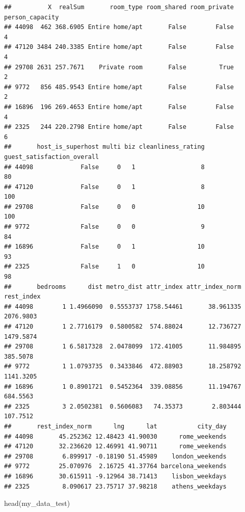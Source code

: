 \documentclass[
]{article}
\newenvironment{Shaded}{\begin{snugshade}}{\end{snugshade}}
\newcommand{\FunctionTok}[1]{\textcolor[rgb]{0.00,0.00,0.00}{#1}}
\newcommand{\NormalTok}[1]{#1}
\begin{document}
\begin{verbatim}
##          X  realSum       room_type room_shared room_private person_capacity
## 44098  462 368.6905 Entire home/apt       False        False               4
## 47120 3484 240.3385 Entire home/apt       False        False               4
## 29708 2631 257.7671    Private room       False         True               2
## 9772   856 485.9543 Entire home/apt       False        False               2
## 16896  196 269.4653 Entire home/apt       False        False               4
## 2325   244 220.2798 Entire home/apt       False        False               6
##       host_is_superhost multi biz cleanliness_rating guest_satisfaction_overall
## 44098             False     0   1                  8                         80
## 47120             False     0   1                  8                        100
## 29708             False     0   0                 10                        100
## 9772              False     0   0                  9                         84
## 16896             False     0   1                 10                         93
## 2325              False     1   0                 10                         98
##       bedrooms      dist metro_dist attr_index attr_index_norm rest_index
## 44098        1 1.4966090  0.5553737 1758.54461       38.961335  2076.9803
## 47120        1 2.7716179  0.5800582  574.88024       12.736727  1479.5874
## 29708        1 6.5817328  2.0478099  172.41005       11.984895   385.5078
## 9772         1 1.0793735  0.3433846  472.88903       18.258792  1141.3205
## 16896        1 0.8901721  0.5452364  339.08856       11.194767   684.5563
## 2325         3 2.0502381  0.5606083   74.35373        2.803444   107.7512
##       rest_index_norm      lng      lat           city_day
## 44098       45.252362 12.48423 41.90030      rome_weekends
## 47120       32.236620 12.46991 41.90711      rome_weekends
## 29708        6.899917 -0.18190 51.45989    london_weekends
## 9772        25.070976  2.16725 41.37764 barcelona_weekends
## 16896       30.615911 -9.12964 38.71413    lisbon_weekdays
## 2325         8.090617 23.75717 37.98218    athens_weekdays
\end{verbatim}

\begin{Shaded}
\begin{Highlighting}[]
\FunctionTok{head}\NormalTok{(my\_data\_test)}
\end{Highlighting}
\end{Shaded}
\end{document}
